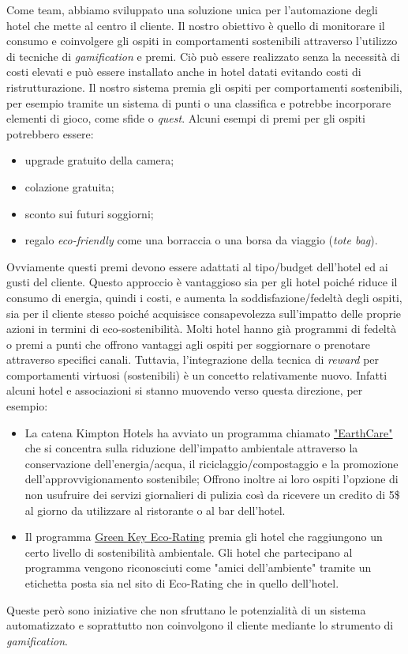 Come team, abbiamo sviluppato una soluzione unica per l'automazione degli hotel che mette al centro il cliente. Il nostro obiettivo è quello di monitorare il consumo e coinvolgere gli ospiti in comportamenti sostenibili attraverso l'utilizzo di tecniche di \textit{gamification} e premi. Ciò può essere realizzato senza la necessità di costi elevati e può essere installato anche in hotel datati evitando costi di ristrutturazione. Il nostro sistema premia gli ospiti per comportamenti sostenibili, per esempio tramite un sistema di punti o una classifica e potrebbe incorporare elementi di gioco, come sfide o \textit{quest}. Alcuni esempi di premi per gli ospiti potrebbero essere:
\begin{itemize}
    \item upgrade gratuito della camera;
    \item colazione gratuita;
    \item sconto sui futuri soggiorni;
    \item regalo \textit{eco-friendly} come una borraccia o una borsa da viaggio (\textit{tote bag}).
\end{itemize}
Ovviamente questi premi devono essere adattati al tipo/budget dell'hotel ed ai gusti del cliente. Questo approccio è vantaggioso sia per gli hotel poiché riduce il consumo di energia, quindi i costi, e aumenta la soddisfazione/fedeltà degli ospiti, sia per il cliente stesso poiché acquisisce consapevolezza sull'impatto delle proprie azioni in termini di eco-sostenibilità.
%
Molti hotel hanno già programmi di fedeltà o premi a punti che offrono vantaggi agli ospiti per soggiornare o prenotare attraverso specifici canali. Tuttavia, l'integrazione della tecnica di \textit{reward} per comportamenti virtuosi (sostenibili) è un concetto relativamente nuovo. Infatti alcuni hotel e associazioni si stanno muovendo verso questa direzione, per esempio:
\begin{itemize}
    \item La catena Kimpton Hotels ha avviato un programma chiamato \href{https://www.ihg.com/kimptonhotels/content/us/en/about-us/kimpton-cares/environment
    }{"EarthCare"}  che si concentra sulla riduzione dell'impatto ambientale attraverso la conservazione dell'energia/acqua, il riciclaggio/compostaggio e la promozione dell'approvvigionamento sostenibile; Offrono inoltre ai loro ospiti l'opzione di non usufruire dei servizi giornalieri di pulizia così da ricevere un credito di 5\$ al giorno da utilizzare al ristorante o al bar dell'hotel.
    \item Il programma \href{http://www.greenkeyglobal.com/home/green-key-eco-rating-2/
    }{Green Key Eco-Rating} premia gli hotel che raggiungono un certo livello di sostenibilità ambientale. Gli hotel che partecipano al programma vengono riconosciuti come "amici dell'ambiente" tramite un etichetta posta sia nel sito di Eco-Rating che in quello dell'hotel.
\end{itemize}
Queste però sono iniziative che non sfruttano le potenzialità di un sistema automatizzato e soprattutto non coinvolgono il cliente mediante lo strumento di \textit{gamification}.

\newpage
